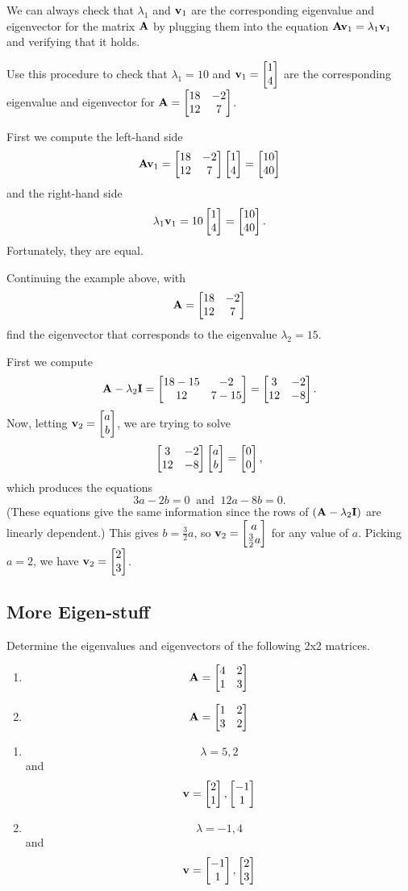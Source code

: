 \begin{prob}
We can always check that $\lambda_1$ and $\mathbf{v}_1$ are the corresponding eigenvalue and eigenvector for the matrix $\mathbf{A}$ by plugging them into the equation $\mathbf{A}\mathbf{v}_1 = \lambda_1\mathbf{v}_1$ and verifying that it holds.

Use this procedure to check that $\lambda_1=10$ and $\mathbf{v}_1=\begin{bmatrix} 1 \\ 4 \end{bmatrix}$ are the corresponding eigenvalue and eigenvector for $\mathbf{A} = \begin{bmatrix} 18 & -2 \\ 12 & 7\end{bmatrix}$.
\end{prob}
\begin{sol}
First we compute the left-hand side
$$\mathbf{A}\mathbf{v}_1 = \begin{bmatrix} 18 & -2 \\ 12 & 7\end{bmatrix}\begin{bmatrix} 1 \\ 4 \end{bmatrix} = \begin{bmatrix} 10 \\ 40 \end{bmatrix}$$
and the right-hand side
$$\lambda_1\mathbf{v}_1 = 10\begin{bmatrix} 1 \\ 4 \end{bmatrix} = \begin{bmatrix} 10 \\ 40 \end{bmatrix}.$$
Fortunately, they are equal.
\end{sol}

\begin{prob}
Continuing the example above, with $$\mathbf{A} = \begin{bmatrix} 18 & -2 \\ 12 & 7\end{bmatrix}$$ find the eigenvector that corresponds to the eigenvalue $\lambda_2 = 15$.
\end{prob}
\begin{sol}
First we compute
$$\mathbf{A} - \lambda_2\mathbf{I} = \begin{bmatrix} 18-15 & -2 \\ 12 & 7-15\end{bmatrix} = \begin{bmatrix} 3 & -2 \\ 12 & -8\end{bmatrix}.$$
Now, letting $\mathbf{v}_2=\begin{bmatrix} a \\ b \end{bmatrix}$, we are trying to solve
$$\begin{bmatrix} 3 & -2 \\ 12 & -8\end{bmatrix}\begin{bmatrix} a \\ b \end{bmatrix} = \begin{bmatrix} 0 \\ 0 \end{bmatrix},$$
which produces the equations
$$3a-2b = 0 \ \text{ and } \ 12a-8b = 0.$$
(These equations give the same information since the rows of $(\mathbf{A}-\lambda_2\mathbf{I})$ are linearly dependent.) This gives $b = \frac{3}{2}a$, so $\mathbf{v}_2=\begin{bmatrix} a \\ \frac{3}{2}a \end{bmatrix}$ for any value of $a$. Picking $a=2$, we have $\mathbf{v}_2 = \begin{bmatrix} 2 \\ 3 \end{bmatrix}$.
\end{sol}

\subsection{More Eigen-stuff}

\begin{prob}\label{EigenvectorQuestion} 
Determine the eigenvalues and eigenvectors of the following 2x2 matrices.
\begin{enumerate}
\item \[ \mathbf{A} = \begin{bmatrix} 4 & 2 \\ 1 & 3\end{bmatrix} \]
\item \[ \mathbf{A} = \begin{bmatrix} 1 & 2 \\ 3 & 2\end{bmatrix} \]
\end{enumerate}
\end{prob}
\begin{sol}
\begin{enumerate}
    \item \[ \lambda = 5,2\] and \[ \mathbf{v} = \begin{bmatrix} 2 \\ 1 \end{bmatrix},\begin{bmatrix} -1 \\ 1 \end{bmatrix}\]
    \item \[ \lambda = -1,4\] and \[ \mathbf{v} = \begin{bmatrix} -1 \\ 1 \end{bmatrix},\begin{bmatrix} 2 \\ 3 \end{bmatrix}\]
\end{enumerate}
\end{sol}

